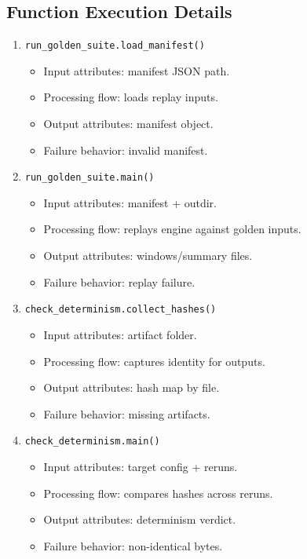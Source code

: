 \documentclass[11pt,a4paper]{article}
\begin{document}
\subsection*{Function Execution Details}
\begin{enumerate}[leftmargin=*]
  \item \texttt{run\_golden\_suite.load\_manifest()}
  \begin{itemize}[leftmargin=*]
    \item Input attributes: manifest JSON path.
    \item Processing flow: loads replay inputs.
    \item Output attributes: manifest object.
    \item Failure behavior: invalid manifest.
  \end{itemize}
  \item \texttt{run\_golden\_suite.main()}
  \begin{itemize}[leftmargin=*]
    \item Input attributes: manifest + outdir.
    \item Processing flow: replays engine against golden inputs.
    \item Output attributes: windows/summary files.
    \item Failure behavior: replay failure.
  \end{itemize}
  \item \texttt{check\_determinism.collect\_hashes()}
  \begin{itemize}[leftmargin=*]
    \item Input attributes: artifact folder.
    \item Processing flow: captures identity for outputs.
    \item Output attributes: hash map by file.
    \item Failure behavior: missing artifacts.
  \end{itemize}
  \item \texttt{check\_determinism.main()}
  \begin{itemize}[leftmargin=*]
    \item Input attributes: target config + reruns.
    \item Processing flow: compares hashes across reruns.
    \item Output attributes: determinism verdict.
    \item Failure behavior: non-identical bytes.
  \end{itemize}
\end{enumerate}
\end{document}
